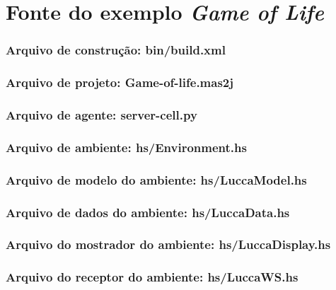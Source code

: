 \chapter{Fonte do exemplo \emph{Game of Life}} \label{anexo-gol}

\subsection*{Arquivo de construção: bin/build.xml}


\subsection*{Arquivo de projeto: Game-of-life.mas2j}


\subsection*{Arquivo de agente: server-cell.py}


\lstset{language=Haskell}
\subsection*{Arquivo de ambiente: hs/Environment.hs}


\subsection*{Arquivo de modelo do ambiente: hs/LuccaModel.hs}


\subsection*{Arquivo de dados do ambiente: hs/LuccaData.hs}


\subsection*{Arquivo do mostrador do ambiente: hs/LuccaDisplay.hs}


\subsection*{Arquivo do receptor do ambiente: hs/LuccaWS.hs}

\label{anexo-gol-endLuccaWS}
